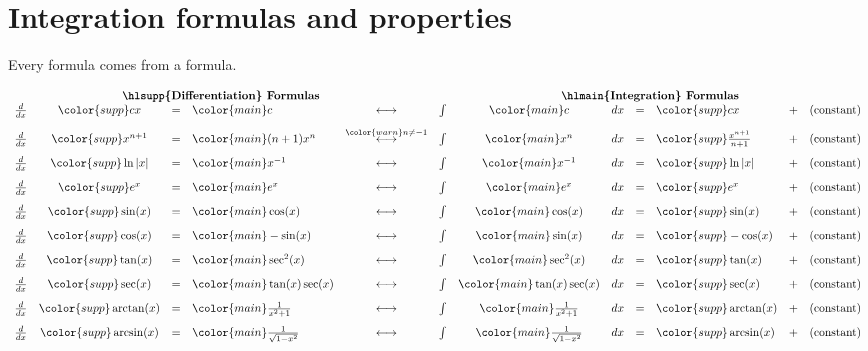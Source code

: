 \documentclass[../main.tex]{subfiles}
\begin{document}
 \section{Integration formulas and properties} \label{sec:integration-formulas}
Every  formula comes from a  formula.

\[
  \begin{array}{rcclcrclllcl}
    \multicolumn{5}{c}{\text{\textbf{\hlsupp{Differentiation} Formulas}}} & \multicolumn{7}{c}{\text{\textbf{\hlmain{Integration} Formulas}}} \\
    \frac{d}{dx} & {\color{supp} cx} &=& {\color{main} c}
    & \longleftrightarrow
    & \int & {\color{main} c} & dx &=& {\color{supp} cx}
    &+& (\text{constant}) \\[2ex]
    \frac{d}{dx} & {\color{supp} x^{n+1}  } &=& {\color{main} (n+1) x^{n}}
    & \overset{\color{warn} n \ne -1}{\longleftrightarrow}
    & \int & {\color{main} x^{n}} & dx &=& {\color{supp} \frac{x^{n+1}}{n+1} }
    &+& (\text{constant}) \\[2ex]
    \frac{d}{dx} & {\color{supp} \ln|x| } &=& {\color{main} x^{-1}}
    & \longleftrightarrow
    & \int & {\color{main} x^{-1}} & dx &=& {\color{supp} \ln|x|}
    &+& (\text{constant}) \\[2ex]
    \frac{d}{dx} & {\color{supp} e^{x}} &=& {\color{main} e^{x}}
    & \longleftrightarrow
    & \int & {\color{main} e^{x}      } & dx &=& {\color{supp} e^{x}}
    &+& (\text{constant}) \\[2ex]
    \frac{d}{dx} & {\color{supp} \sin(x)} &=& {\color{main} \cos(x)}
    & \longleftrightarrow
    & \int & {\color{main} \cos(x)} & dx &=& {\color{supp} \sin(x)}
    &+& (\text{constant}) \\[2ex]
    \frac{d}{dx} & {\color{supp} \cos(x)} &=& {\color{main} -\sin(x)}
    & \longleftrightarrow
    & \int & {\color{main} \sin(x)} & dx &=& {\color{supp} -\cos(x)}
    &+& (\text{constant}) \\[2ex]
    \frac{d}{dx} & {\color{supp} \tan(x)} &=& {\color{main} \sec^{2}(x)}
    & \longleftrightarrow
    & \int & {\color{main} \sec^{2}(x)} & dx &=& {\color{supp} \tan(x)}
    &+& (\text{constant}) \\[2ex]
    \frac{d}{dx} & {\color{supp} \sec(x)} &=& {\color{main} \tan(x)\sec(x)}
    & \longleftrightarrow
    & \int & {\color{main} \tan(x)\sec(x)} & dx &=& {\color{supp} \sec(x)}
    &+& (\text{constant}) \\[2ex]
    \frac{d}{dx} & {\color{supp} \arctan(x)} &=& {\color{main} \frac{1}{x^{2}+1}}
    & \longleftrightarrow
    & \int & {\color{main} \frac{1}{x^{2} + 1}} & dx &=& {\color{supp} \arctan(x)}
    &+& (\text{constant}) \\[2ex]
    \frac{d}{dx} & {\color{supp} \arcsin(x)} &=& {\color{main} \frac{1}{\sqrt{1 - x^{2}}}}
    & \longleftrightarrow
    & \int & {\color{main} \frac{1}{\sqrt{1 - x^{2}}}} & dx &=& {\color{supp} \arcsin(x)}
    &+& (\text{constant})
  \end{array}
\]
\end{document}
